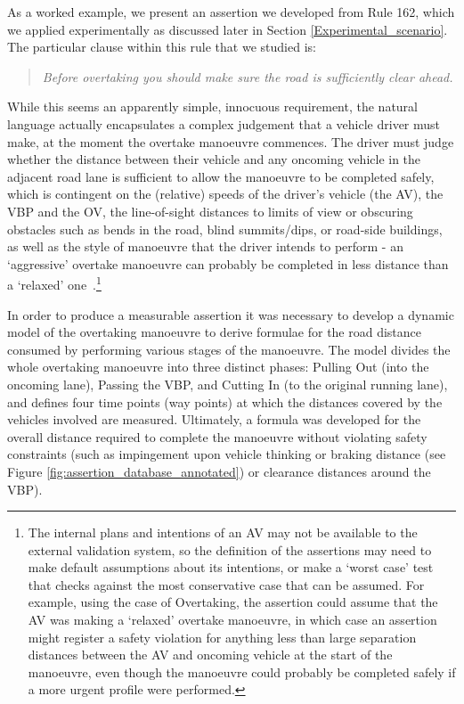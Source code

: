 As a worked example, we present an assertion we developed from Rule 162, which we applied experimentally as discussed later in Section \ref{Experimental_scenario}. The particular clause within this rule that we studied is:
\begin{quote}
    \textit{Before overtaking you should make sure the road is sufficiently clear ahead.}
\end{quote}
While this seems an apparently simple, innocuous requirement, the natural language actually encapsulates a complex judgement that a vehicle driver must make, at the moment the overtake manoeuvre commences. The driver must judge whether the distance between their vehicle and any oncoming vehicle in the adjacent road lane is sufficient to allow the manoeuvre to be completed safely, which is contingent on the (relative) speeds of the driver's vehicle (the AV), the VBP and the OV, the line-of-sight distances to limits of view or obscuring obstacles such as bends in the road, blind summits/dips, or road-side buildings, as well as the style of manoeuvre that the driver intends to perform - an `aggressive' overtake manoeuvre can probably be completed in less distance than a `relaxed' one~\cite{decastro2018counterexample, tkachenko2018line}.\footnote{The internal plans and intentions of an AV may not be available to the external validation system, so the definition of the assertions may need to make default assumptions about its intentions, or make a `worst case' test that checks against the most conservative case that can be assumed. For example, using the case of Overtaking, the assertion could assume that the AV was making a `relaxed' overtake manoeuvre, in which case an assertion might register a safety violation for anything less than large separation distances between the AV and oncoming vehicle at the start of the manoeuvre, even though the manoeuvre could probably be completed safely if a more urgent profile were performed.} 

In order to produce a measurable assertion it was necessary to develop a dynamic model of the overtaking manoeuvre to derive formulae for the road distance consumed by performing various stages of the manoeuvre. 
%
The model divides the whole overtaking manoeuvre into three distinct phases: Pulling Out (into the oncoming lane), Passing the VBP, and Cutting In (to the original running lane), and defines four time points (way points) at which the distances covered by the vehicles involved are measured. Ultimately, a formula was developed for the overall distance required to complete the manoeuvre without violating safety constraints (such as impingement upon vehicle thinking or braking distance %
(see Figure \ref{fig:assertion_database_annotated}) or clearance distances around the VBP). 

